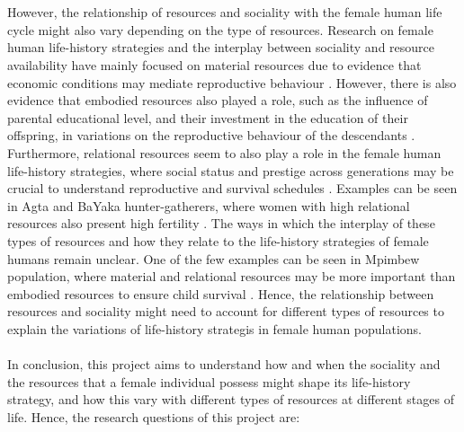 \documentclass{article}
\begin{document}
\\\\
However, the relationship of resources and sociality with the female human life cycle might also vary depending on the type of resources. Research on female human life-history strategies and the interplay between sociality and resource availability have mainly focused on material resources due to evidence that economic conditions may mediate reproductive behaviour \citep{shenk2013model}. However, there is also evidence that embodied resources also played a role, such as the influence of parental educational level, and their investment in the education of their offspring, in variations on the reproductive behaviour of the descendants \citep{kaplan1996theory,snopkowski2014synthetic,snopkowski2016pathways}. Furthermore, relational resources seem to also play a role in the female human life-history strategies, where social status and prestige across generations may be crucial to understand reproductive and survival schedules \citep{boone1999more,shenk2016status}. Examples can be seen in Agta and BaYaka hunter-gatherers, where women with high relational resources also present high fertility \citep{chaudhary2016competition,page2017hunter}. The ways in which the interplay of these types of resources and how they relate to the life-history strategies of female humans remain unclear. One of the few examples can be seen in Mpimbew population, where material and relational resources may be more important than embodied resources to ensure child survival \citep{mulder2011understanding}. Hence, the relationship between resources and sociality might need to account for different types of resources to explain the variations of life-history strategis in female human populations.
\\\\
In conclusion, this project aims to understand how and when the sociality and the resources that a female individual possess might shape its life-history strategy, and how this vary with different types of resources at different stages of life. Hence, the research questions of this project are:
\end{document}
